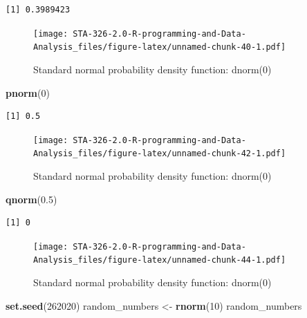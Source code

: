 \documentclass[
]{book}
\newenvironment{Shaded}{\begin{snugshade}}{\end{snugshade}}
\newcommand{\DecValTok}[1]{\textcolor[rgb]{0.00,0.00,0.81}{#1}}
\newcommand{\FloatTok}[1]{\textcolor[rgb]{0.00,0.00,0.81}{#1}}
\newcommand{\KeywordTok}[1]{\textcolor[rgb]{0.13,0.29,0.53}{\textbf{#1}}}
\newcommand{\NormalTok}[1]{#1}
\newcommand{\StringTok}[1]{\textcolor[rgb]{0.31,0.60,0.02}{#1}}
\begin{document}
\begin{verbatim}
[1] 0.3989423
\end{verbatim}

\begin{figure}
\centering
\texttt{[image: STA-326-2.0-R-programming-and-Data-Analysis\_files/figure-latex/unnamed-chunk-40-1.pdf]}
\caption{\label{fig:unnamed-chunk-40}Standard normal probability density function: dnorm(0)}
\end{figure}

\begin{Shaded}
\begin{Highlighting}[]
\KeywordTok{pnorm}\NormalTok{(}\DecValTok{0}\NormalTok{)}
\end{Highlighting}
\end{Shaded}

\begin{verbatim}
[1] 0.5
\end{verbatim}

\begin{figure}
\centering
\texttt{[image: STA-326-2.0-R-programming-and-Data-Analysis\_files/figure-latex/unnamed-chunk-42-1.pdf]}
\caption{\label{fig:unnamed-chunk-42}Standard normal probability density function: dnorm(0)}
\end{figure}

\begin{Shaded}
\begin{Highlighting}[]
\KeywordTok{qnorm}\NormalTok{(}\FloatTok{0.5}\NormalTok{)}
\end{Highlighting}
\end{Shaded}

\begin{verbatim}
[1] 0
\end{verbatim}

\begin{figure}
\centering
\texttt{[image: STA-326-2.0-R-programming-and-Data-Analysis\_files/figure-latex/unnamed-chunk-44-1.pdf]}
\caption{\label{fig:unnamed-chunk-44}Standard normal probability density function: dnorm(0)}
\end{figure}

\begin{Shaded}
\begin{Highlighting}[]
\KeywordTok{set.seed}\NormalTok{(}\DecValTok{262020}\NormalTok{)}
\NormalTok{random_numbers <-}\StringTok{ }\KeywordTok{rnorm}\NormalTok{(}\DecValTok{10}\NormalTok{)}
\NormalTok{random_numbers}
\end{Highlighting}
\end{Shaded}
\end{document}
